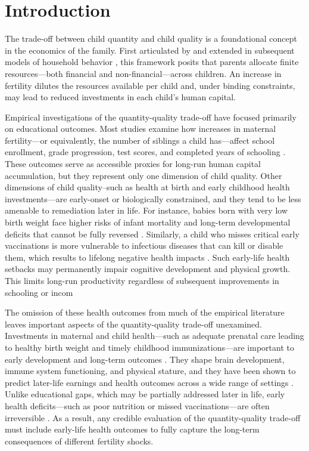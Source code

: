 \documentclass[]{AEA}
\begin{document}
\section{Introduction}

The trade-off between child quantity and child quality is a foundational
concept in the economics of the family. First articulated by
\citet{becker1960economic} and extended in subsequent models of
household behavior \citep{becker1973interaction, becker1976child}, this
framework posits that parents allocate finite resources---both financial
and non-financial---across children. An increase in fertility dilutes
the resources available per child and, under binding constraints, may
lead to reduced investments in each child's human capital.

Empirical investigations of the quantity-quality trade-off have focused
primarily on educational outcomes. Most studies examine how increases in
maternal fertility---or equivalently, the number of siblings a child
has---affect school enrollment, grade progression, test scores, and
completed years of schooling
\citep{rosenzweig1980testing, black2005more, angrist2010multiple}. These
outcomes serve as accessible proxies for long-run human capital
accumulation, but they represent only one dimension of child quality.
Other dimensions of child quality--such as health at birth and early
childhood health investments---are early-onset or biologically
constrained, and they tend to be less amenable to remediation later in
life. For instance, babies born with very low birth weight face higher
risks of infant mortality and long-term developmental deficits that
cannot be fully reversed \citep{cook2015understanding}. Similarly, a
child who misses critical early vaccinations is more vulnerable to
infectious diseases that can kill or disable them, which results to
lifelong negative health impacts \citep{costa2024child}. Such early-life
health setbacks may permanently impair cognitive development and
physical growth. This limits long-run productivity regardless of
subsequent improvements in schooling or incom

The omission of these health outcomes from much of the empirical
literature leaves important aspects of the quantity-quality trade-off
unexamined. Investments in maternal and child health---such as adequate
prenatal care leading to healthy birth weight and timely childhood
immunizations---are important to early development and long-term
outcomes \citep{victora2008maternal, hoddinott2013adult}. They shape
brain development, immune system functioning, and physical stature, and
they have been shown to predict later-life earnings and health outcomes
across a wide range of settings
\citep{grantham2007development, alderman2006long}. Unlike educational
gaps, which may be partially addressed later in life, early health
deficits---such as poor nutrition or missed vaccinations---are often
irreversible \citep{victora2008maternal, hoddinott2013adult}. As a
result, any credible evaluation of the quantity-quality trade-off must
include early-life health outcomes to fully capture the long-term
consequences of different fertility shocks.
\end{document}
